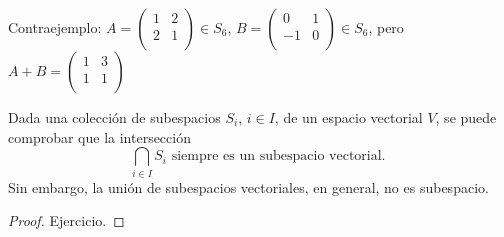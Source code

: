 \begin{example}
\begin{enumerate}
\begin{itemize}
			            Contraejemplo: \(A = \begin{pmatrix}
				            1 & 2 \\
				            2 & 1 \\
			            \end{pmatrix} \in S_6\), \(B = \begin{pmatrix}
				            0  & 1 \\
				            -1 & 0 \\
			            \end{pmatrix} \in S_6\), pero \(A + B = \begin{pmatrix}
				            1 & 3 \\
				            1 & 1 \\
			            \end{pmatrix}\)
		      \end{itemize}
	\end{enumerate}
\end{example}
\begin{proposition}
	Dada una colección de subespacios \(S_i \), \(i \in I \), de un espacio vectorial \(V \), se puede comprobar que la intersección
	\[
		\bigcap_{i \in I} S_i \text{ siempre es un subespacio vectorial. }
	\]
	Sin embargo, la unión de subespacios vectoriales, en general, no es subespacio.
\end{proposition}
\begin{proof}
	Ejercicio.
\end{proof}

